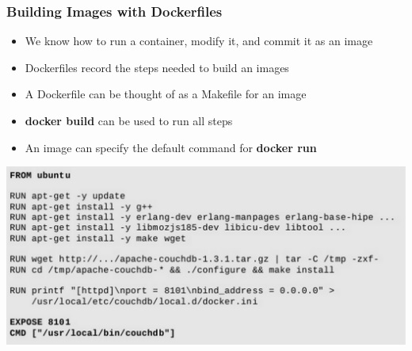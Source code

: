 \documentclass[xcolor=dvipsnames]{beamer}
\begin{document}
\begin{frame}[fragile]
  \frametitle{Building Images with Dockerfiles}

  
  \begin{itemize}
  \item We know how to run a container, modify it, and commit it as an image
  \item Dockerfiles record the steps needed to build an images
  \item A Dockerfile can be thought of as a Makefile for an image
  \item \textbf{docker build} can be used to run all steps
  \item An image can specify the default command for \textbf{docker run}
  \end{itemize}

  \includegraphics[width=\textwidth]{figures/dockerfile.pdf}
  
\end{frame}
\end{document}
